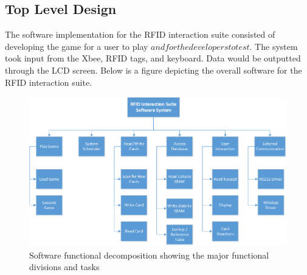 \documentclass[12pt]{article} %
\begin{document}
\subsection{Top Level Design}\label{swTopLevel} %
%

The software implementation for the RFID interaction suite consisted of developing the game for a user to play \(and for the developers to test\). The system took input from the Xbee, RFID tags, and keyboard. Data would be outputted through the LCD screen. Below is a figure depicting the overall software for the RFID interaction suite. 

\begin{figure}[H]
	\centering
	\includegraphics[width=\textwidth]{images/funDecomp.png}
	\caption{Software functional decomposition showing the major functional divisions and tasks}
	\label{fig:funDecomp}
\end{figure}
\end{document}
